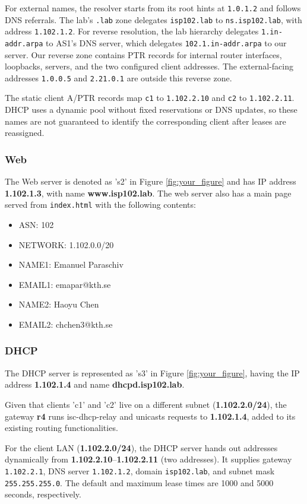 \documentclass{article}
\begin{document}
For external names, the resolver starts from its root hints at \texttt{1.0.1.2} and follows DNS referrals. The lab's \texttt{.lab} zone delegates \texttt{isp102.lab} to \texttt{ns.isp102.lab}, with address \texttt{1.102.1.2}. For reverse resolution, the lab hierarchy delegates \texttt{1.in-addr.arpa} to AS1's DNS server, which delegates \texttt{102.1.in-addr.arpa} to our server. Our reverse zone contains PTR records for internal router interfaces, loopbacks, servers, and the two configured client addresses. The external-facing addresses \texttt{1.0.0.5} and \texttt{2.21.0.1} are outside this reverse zone.

The static client A/PTR records map \texttt{c1} to \texttt{1.102.2.10} and \texttt{c2} to \texttt{1.102.2.11}. DHCP uses a dynamic pool without fixed reservations or DNS updates, so these names are not guaranteed to identify the corresponding client after leases are reassigned.

\subsubsection{Web}

The Web server is denoted as 's2' in Figure \ref{fig:your_figure} and has IP address \textbf{1.102.1.3}, with name \textbf{www.isp102.lab}. The web server also has a main page served from \texttt{index.html} with the following contents:

\begin{itemize}
    \item  ASN: 102
\item NETWORK: 1.102.0.0/20
\item NAME1: Emanuel Paraschiv
\item EMAIL1: emapar@kth.se
\item NAME2: Haoyu Chen 
\item EMAIL2: chchen3@kth.se 
\end{itemize}


\subsubsection{DHCP}

The DHCP server is represented as 's3' in Figure \ref{fig:your_figure}, having the IP address \textbf{1.102.1.4} and name \textbf{dhcpd.isp102.lab}.


Given that clients 'c1' and 'c2' live on a different subnet
(\textbf{1.102.2.0/24}), the gateway \textbf{r4} runs isc-dhcp-relay and unicasts requests to \textbf{1.102.1.4}, added to its existing routing functionalities. 


For the client LAN (\textbf{1.102.2.0/24}), the DHCP server hands out addresses dynamically from \textbf{1.102.2.10}--\textbf{1.102.2.11} (two addresses). It supplies gateway \texttt{1.102.2.1}, DNS server \texttt{1.102.1.2}, domain \texttt{isp102.lab}, and subnet mask \texttt{255.255.255.0}. The default and maximum lease times are 1000 and 5000 seconds, respectively.
\end{document}

